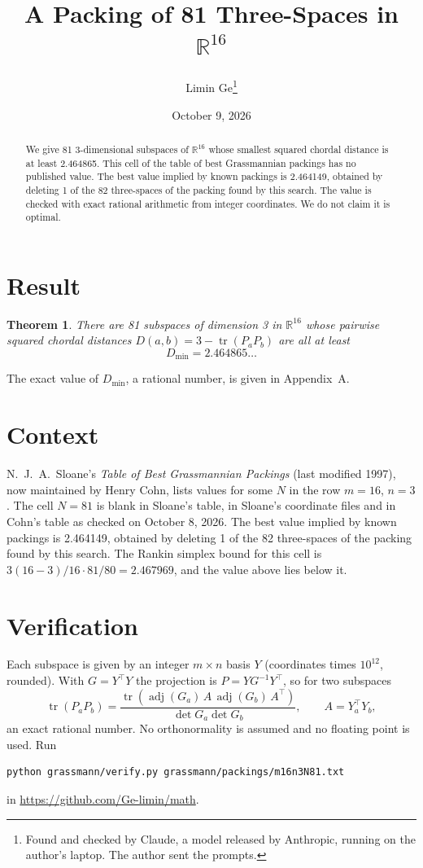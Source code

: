 \documentclass[11pt,a4paper]{article}
\title{A Packing of 81 Three-Spaces in $\mathbb{R}^{16}$}
\author{Limin Ge\thanks{Found and checked by Claude, a model released by Anthropic, running on the author's laptop. The author sent the prompts.}}
\date{October 9, 2026}
\newtheorem*{theorem}{Theorem}
\begin{document}
\maketitle
\begin{abstract}
We give 81 3-dimensional subspaces of $\mathbb{R}^{16}$ whose smallest squared chordal distance is at least 2.464865. This cell of the table of best Grassmannian packings has no published value. The best value implied by known packings is 2.464149, obtained by deleting 1 of the 82 three-spaces of the packing found by this search. The value is checked with exact rational arithmetic from integer coordinates. We do not claim it is optimal.
\end{abstract}

\section{Result}
\begin{theorem}
There are 81 subspaces of dimension 3 in $\mathbb{R}^{16}$ whose pairwise squared chordal distances $D(a,b) = 3 - \operatorname{tr}(P_aP_b)$ are all at least
\[ D_{\min} = 2.464865\ldots \]
\end{theorem}
The exact value of $D_{\min}$, a rational number, is given in Appendix~A.


\section{Context}
N.~J.~A.~Sloane's \emph{Table of Best Grassmannian Packings} (last modified 1997), now maintained by Henry Cohn, lists values for some $N$ in the row $m=16$, $n=3$. The cell $N=81$ is blank in Sloane's table, in Sloane's coordinate files and in Cohn's table as checked on October 8, 2026. The best value implied by known packings is 2.464149, obtained by deleting 1 of the 82 three-spaces of the packing found by this search. The Rankin simplex bound for this cell is $3(16-3)/16\cdot 81/80 = 2.467969$, and the value above lies below it.


\section{Verification}
Each subspace is given by an integer $m\times n$ basis $Y$ (coordinates times $10^{12}$, rounded). With $G=Y^\top Y$ the projection is $P=YG^{-1}Y^\top$, so for two subspaces
\[ \operatorname{tr}(P_aP_b)=\frac{\operatorname{tr}(\operatorname{adj}(G_a)\,A\,\operatorname{adj}(G_b)\,A^\top)}{\det G_a\det G_b},\qquad A=Y_a^\top Y_b, \]
an exact rational number. No orthonormality is assumed and no floating point is used. Run
\begin{verbatim}
python grassmann/verify.py grassmann/packings/m16n3N81.txt
\end{verbatim}
in \url{https://github.com/Ge-limin/math}.
\end{document}
